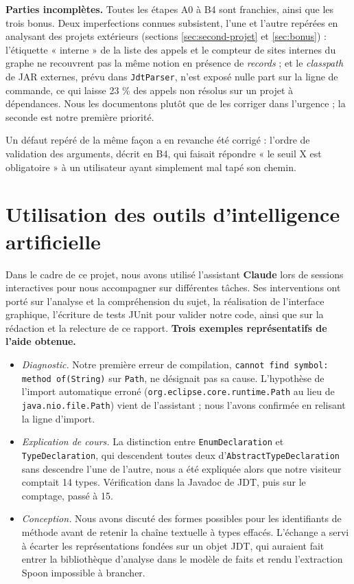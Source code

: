 \documentclass[11pt,a4paper]{article}
\begin{document}
\textbf{Parties incomplètes.} Toutes les étapes A0 à B4 sont franchies, ainsi que les trois bonus. Deux imperfections connues subsistent, l'une et l'autre repérées en analysant des projets extérieurs (sections \ref{sec:second-projet} et \ref{sec:bonus}) : l'étiquette « interne » de la liste des appels et le compteur de sites internes du graphe ne recouvrent pas la même notion en présence de \textit{records} ; et le \textit{classpath} de JAR externes, prévu dans \texttt{JdtParser}, n'est exposé nulle part sur la ligne de commande, ce qui laisse 23 \% des appels non résolus sur un projet à dépendances. Nous les documentons plutôt que de les corriger dans l'urgence ; la seconde est notre première priorité.

Un défaut repéré de la même façon a en revanche été corrigé : l'ordre de validation des arguments, décrit en B4, qui faisait répondre « le seuil X est obligatoire » à un utilisateur ayant simplement mal tapé son chemin.

\section{Utilisation des outils d'intelligence artificielle}

Dans le cadre de ce projet, nous avons utilisé l'assistant \textbf{Claude} lors de sessions interactives pour nous accompagner sur différentes tâches. Ses interventions ont porté sur l'analyse et la compréhension du sujet, la réalisation de l'interface graphique, l'écriture de tests JUnit pour valider notre code, ainsi que sur la rédaction et la relecture de ce rapport.
\textbf{Trois exemples représentatifs de l'aide obtenue.}

\begin{itemize}
\item \textit{Diagnostic.} Notre première erreur de compilation, \texttt{cannot find symbol: method of(String)} sur \texttt{Path}, ne désignait pas sa cause. L'hypothèse de l'import automatique erroné (\texttt{org.eclipse.core.runtime.Path} au lieu de \texttt{java.nio.file.Path}) vient de l'assistant ; nous l'avons confirmée en relisant la ligne d'import.
\item \textit{Explication de cours.} La distinction entre \texttt{EnumDeclaration} et \texttt{TypeDeclaration}, qui descendent toutes deux d'\texttt{AbstractTypeDeclaration} sans descendre l'une de l'autre, nous a été expliquée alors que notre visiteur comptait 14 types. Vérification dans la Javadoc de JDT, puis sur le comptage, passé à 15.
\item \textit{Conception.} Nous avons discuté des formes possibles pour les identifiants de méthode avant de retenir la chaîne textuelle à types effacés. L'échange a servi à écarter les représentations fondées sur un objet JDT, qui auraient fait entrer la bibliothèque d'analyse dans le modèle de faits et rendu l'extraction Spoon impossible à brancher.
\end{itemize}
\end{document}
